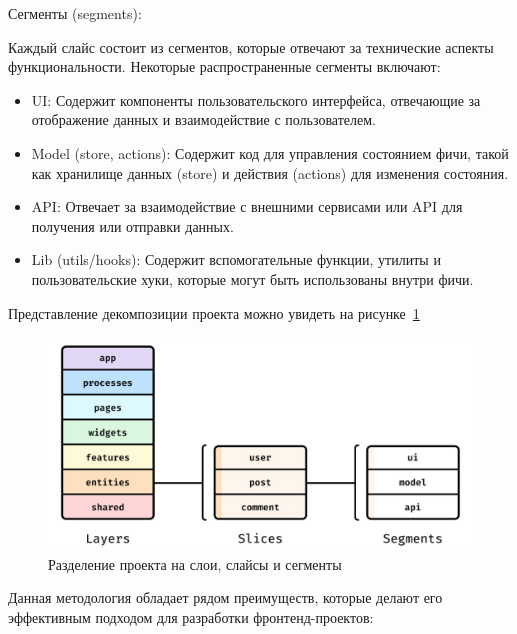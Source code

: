 Сегменты (segments):

Каждый слайс состоит из сегментов, которые отвечают за технические аспекты функциональности. Некоторые распространенные сегменты включают:

\begin{itemize}
    \item UI: Содержит компоненты пользовательского интерфейса, отвечающие за отображение данных и взаимодействие с пользователем.
    \item Model (store, actions): Содержит код для управления состоянием фичи, такой как хранилище данных (store) и действия (actions) для изменения состояния.
    \item API: Отвечает за взаимодействие с внешними сервисами или API для получения или отправки данных.
    \item Lib (utils/hooks): Содержит вспомогательные функции, утилиты и пользовательские хуки, которые могут быть использованы внутри фичи.
\end{itemize}

Представление декомпозиции проекта можно увидеть на рисунке~\ref{fig:fsd}

\begin{figure}
  \includegraphics[scale=0.6]{styles/diploma/inc/fsd-pic1.png}
  \caption{Разделение проекта на слои, слайсы и сегменты}
  \label{fig:fsd}
\end{figure}

Данная методология обладает рядом преимуществ, которые делают его эффективным подходом для разработки фронтенд-проектов:

